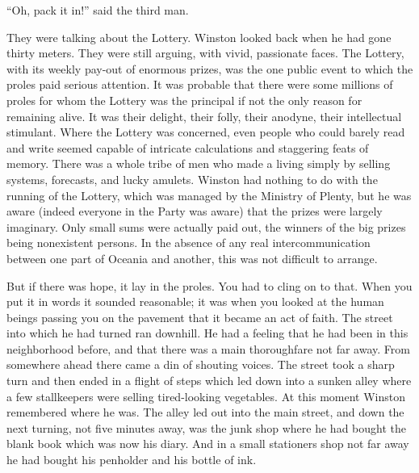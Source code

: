 ``Oh, pack it in!'' said the third man.

They were talking about the Lottery. Winston looked back when he had
gone thirty meters. They were still arguing, with vivid, passionate
faces. The Lottery, with its weekly pay-out of enormous prizes, was the
one public event to which the proles paid serious attention. It was
probable that there were some millions of proles for whom the Lottery
was the principal if not the only reason for remaining alive. It was
their delight, their folly, their anodyne, their intellectual stimulant.
Where the Lottery was concerned, even people who could barely read and
write seemed capable of intricate calculations and staggering feats of
memory. There was a whole tribe of men who made a living simply by
selling systems, forecasts, and lucky amulets. Winston had nothing to do
with the running of the Lottery, which was managed by the Ministry of
Plenty, but he was aware (indeed everyone in the Party was aware) that
the prizes were largely imaginary. Only small sums were actually paid
out, the winners of the big prizes being nonexistent persons. In the
absence of any real intercommunication between one part of Oceania and
another, this was not difficult to arrange.

But if there was hope, it lay in the proles. You had to cling on to
that. When you put it in words it sounded reasonable; it was when you
looked at the human beings passing you on the pavement that it became an
act of faith. The street into which he had turned ran downhill. He had a
feeling that he had been in this neighborhood before, and that there was
a main thoroughfare not far away. From somewhere ahead there came a din
of shouting voices. The street took a sharp turn and then ended in a
flight of steps which led down into a sunken alley where a few
stallkeepers were selling tired-looking vegetables. At this moment
Winston remembered where he was. The alley led out into the main street,
and down the next turning, not five minutes away, was the junk shop
where he had bought the blank book which was now his diary. And in a
small stationer\textquotesingle s shop not far away he had bought his
penholder and his bottle of ink.

